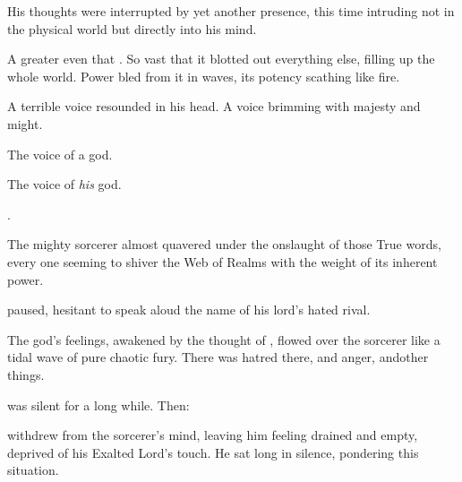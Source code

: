 \begin{garbage}
His thoughts were interrupted by yet another presence, this time intruding not in the physical world but directly into his mind. 

A \vertex{} greater even that \Ishnaruchaefir. 
So vast that it blotted out everything else, filling up the whole world. 
Power bled from it in waves, its potency scathing like fire. 

A terrible voice resounded in his head. 
A voice brimming with majesty and \daemonic{} might. 

The voice of a god. 

The voice of \emph{his} god. 

\Secherdamon. 


The mighty sorcerer almost quavered under the onslaught of those {True \Draconic} words, every one seeming to shiver the Web of Realms with the weight of its inherent power. 



\Psyrex{} paused, hesitant to speak aloud the name of his lord's hated rival. 


The god's feelings, awakened by the thought of \Ishnaruchaefir, flowed over the sorcerer like a tidal wave of pure chaotic fury. 
There was hatred there, and anger, and\prikker other things. 



\Secherdamon{} was silent for a long while. 
Then: 


\Secherdamon{} withdrew from the sorcerer's mind, leaving him feeling drained and empty, deprived of his Exalted Lord's touch. 
He sat long in silence, pondering this situation. 

\end{garbage}
